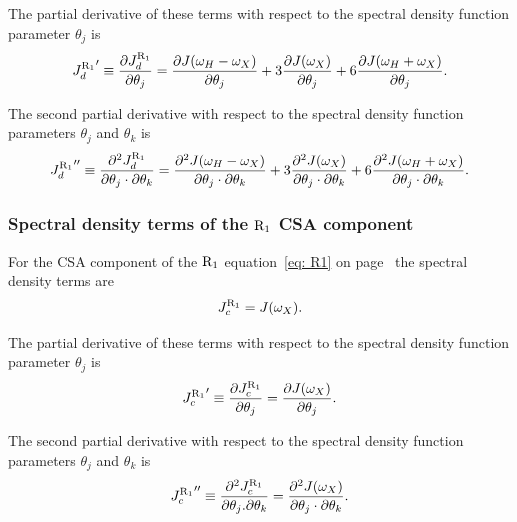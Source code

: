 \noindent The partial derivative of these terms with respect to the spectral density function parameter $\theta_j$ is
\begin{equation}
    {J_d^{\mathrm{R}_1}}' \equiv \frac{\partial J_d^{\mathrm{R}_1}}{\partial \theta_j}
        = \frac{\partial J(\omega_H - \omega_X)}{\partial \theta_j}
        + 3 \frac{\partial J(\omega_X)}{\partial \theta_j}
        + 6 \frac{\partial J(\omega_H + \omega_X)}{\partial \theta_j}.  \label{eq: J terms: JR1d'}
\end{equation}

\noindent The second partial derivative with respect to the spectral density function parameters $\theta_j$ and $\theta_k$ is
\begin{equation}
    {J_d^{\mathrm{R}_1}}'' \equiv \frac{\partial^2 J_d^{\mathrm{R}_1}}{\partial \theta_j \cdot \partial \theta_k}
        = \frac{\partial^2 J(\omega_H - \omega_X)}{\partial \theta_j \cdot \partial \theta_k}
        + 3 \frac{\partial^2 J(\omega_X)}{\partial \theta_j \cdot \partial \theta_k}
        + 6 \frac{\partial^2 J(\omega_H + \omega_X)}{\partial \theta_j \cdot \partial \theta_k}.  \label{eq: J terms: JR1d"}
\end{equation}


\subsubsection{Spectral density terms of the $\mathrm{R}_1$ CSA component}

For the CSA component of the $\mathrm{R}_1$ equation~\eqref{eq: R1} on page~\pageref{eq: R1} the spectral density terms are
\begin{equation}
    J_c^{\mathrm{R}_1} = J(\omega_X).  \label{eq: J terms: JR1c}
\end{equation}

\noindent The partial derivative of these terms with respect to the spectral density function parameter $\theta_j$ is
\begin{equation}
    {J_c^{\mathrm{R}_1}}' \equiv \frac{\partial J_c^{\mathrm{R}_1}}{\partial \theta_j}
        = \frac{\partial J(\omega_X)}{\partial \theta_j}.  \label{eq: J terms: JR1c'}
\end{equation}

\noindent The second partial derivative with respect to the spectral density function parameters $\theta_j$ and $\theta_k$ is
\begin{equation}
    {J_c^{\mathrm{R}_1}}'' \equiv \frac{\partial^2 J_c^{\mathrm{R}_1}}{\partial \theta_j . \partial \theta_k}
        = \frac{\partial^2 J(\omega_X)}{\partial \theta_j \cdot \partial \theta_k}.  \label{eq: J terms: JR1c"}
\end{equation}


